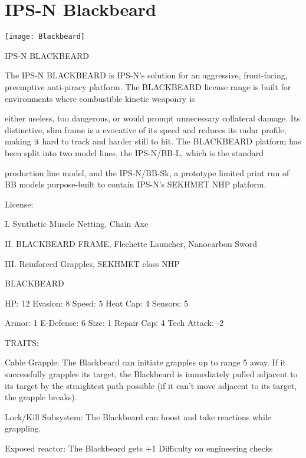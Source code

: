 \section{IPS-N Blackbeard}

\texttt{[image: Blackbeard]}


                                         IPS-N BLACKBEARD


The IPS-N BLACKBEARD is IPS-N’s solution for an aggressive, front-facing, preemptive anti-piracy
platform. The BLACKBEARD license range is built for environments where combustible kinetic weaponry is

either useless, too dangerous, or would prompt unnecessary collateral damage. Its distinctive, slim frame is
a evocative of its speed and reduces its radar profile, making it hard to track and harder still to hit. The
BLACKBEARD platform has been split into two model lines, the IPS-N/BB-L, which is the standard

production line model, and the IPS-N/BB-Sk, a prototype limited print run of BB models purpose-built to
contain IPS-N’s SEKHMET NHP platform.

                                                     License:

I. Synthetic Muscle Netting, Chain Axe

II. BLACKBEARD FRAME, Flechette Launcher, Nanocarbon Sword

III. Reinforced Grapples, SEKHMET class NHP


                                                BLACKBEARD

  HP: 12          Evasion: 8                             Speed: 5            Heat Cap: 4        Sensors: 5

  Armor: 1        E-Defense: 6                           Size: 1             Repair Cap: 4      Tech Attack: -2

                                                     TRAITS:

  Cable Grapple: The Blackbeard can initiate grapples up to range 5 away. If it successfully grapples its
  target, the Blackbeard is immediately pulled adjacent to its target by the straightest path possible (if it
  can’t move adjacent to its target, the grapple breaks).

  Lock/Kill Subsystem: The Blackbeard can boost and take reactions while grappling.

  Exposed reactor: The Blackbeard gets +1 Difficulty on engineering checks

